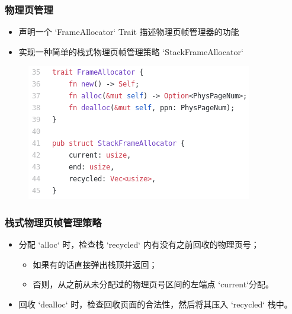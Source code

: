 \begin{frame}
    \frametitle{物理页管理}
% 
% 
% 
        \begin{itemize}
        \item 声明一个 `FrameAllocator` Trait 描述物理页帧管理器的功能
        \item 实现一种简单的栈式物理页帧管理策略 `StackFrameAllocator` 
        \end{itemize}
% 
    \begin{figure}
        \centering
        \includegraphics[width=0.6\linewidth]{figs/frame_allocator-L35.png}
    \end{figure}
% 
% 
\end{frame}
\begin{frame}
    \frametitle{栈式物理页帧管理策略}
% 
        \begin{itemize}
        \item 分配 `alloc` 时，检查栈 `recycled` 内有没有之前回收的物理页号；
            \begin{itemize}
            \item 如果有的话直接弹出栈顶并返回；
            \item 否则，从之前从未分配过的物理页号区间的左端点 `current`分配。
            \end{itemize}
        \item 回收 `dealloc` 时，检查回收页面的合法性，然后将其压入 `recycled` 栈中。
        \end{itemize}
% 
% 
% 
% 
\end{frame}
